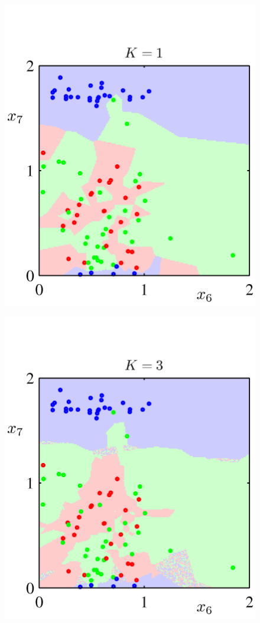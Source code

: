 \documentclass[b5paper]{book}
\numberwithin{equation}{chapter}
\begin{document}
{\begin{figure}[ht]
\begin{minipage}[t]{0.3\linewidth}
		\includegraphics[scale=0.8]{Images/2-28a.png}
		\label{fig:2-28a}
		\end{minipage}
		\begin{minipage}[t]{0.3\linewidth}
		\centering
		\includegraphics[scale=0.8]{Images/2-28b.png}

\end{minipage}
\end{figure}}
\end{document}

